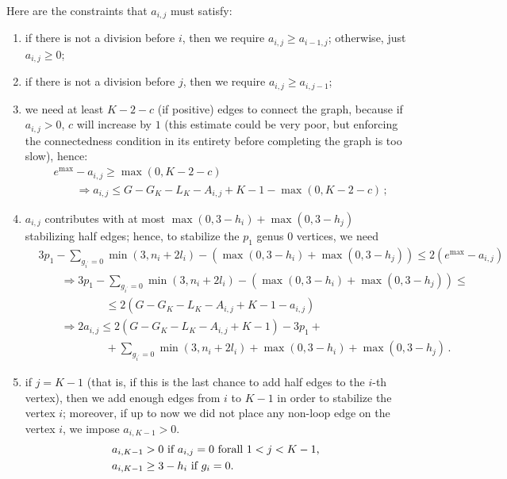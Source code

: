 \documentclass{amsart}
\theoremstyle{plain}
\theoremstyle{definition}
\DeclareMathOperator{\MAX}{max}
\begin{document}
Here are the constraints that $a_{i,j}$ must satisfy:
\begin{enumerate}
\item if there is not a division before $i$, then we require $a_{i,j} \geq
  a_{i-1,j}$; otherwise, just $a_{i,j} \geq 0$;
\item if there is not a division before $j$, then we require $a_{i,j}
  \geq a_{i,j-1}$;
\item we need at least $K-2-c$ (if positive) edges to connect the
  graph, because if $a_{i,j} > 0$, $c$ will increase by $1$ (this
  estimate could be very poor, but enforcing the connectedness
  condition in its entirety before completing the graph is too slow),
  hence:
  \begin{align*}
    &e^{\MAX} - a_{i,j} \geq \max(0, K-2-c)\\
    &\qquad\Rightarrow a_{i,j} \leq G - G_K - L_K - A_{i,j} +K - 1 - \max(0, K-2-c)\,\text{;}
  \end{align*}
\item $a_{i,j}$ contributes with at most $\max(0, 3-h_i) + \max(0,
  3-h_j)$ stabilizing half edges; hence, to stabilize the $p_1$ genus
  $0$ vertices, we need
  \begin{align*}
    &3p_1 - \sum_{g_{i^\prime} = 0} \min(3, n_i + 2l_i) - (\max(0, 3-h_i) + \max(0, 3-h_j)) \leq 2 (e^{\MAX} - a_{i,j})\\
    &\qquad\Rightarrow 3p_1 - \sum_{g_{i^\prime} = 0} \min(3, n_i + 2l_i) - (\max(0, 3-h_i) + \max(0, 3-h_j)) \leq \\
    &\qquad\qquad\qquad \leq 2 (G - G_K - L_K - A_{i,j} + K - 1 - a_{i,j})\\
    &\qquad\Rightarrow 2a_{i,j} \leq 2 (G - G_K - L_K - A_{i,j} + K - 1) - 3p_1 +\\
    &\qquad\qquad\qquad +\sum_{g_{i^\prime} = 0} \min(3, n_i + 2l_i) + \max(0, 3-h_i) + \max(0, 3-h_j)\,\text{.}
  \end{align*}
\item if $j = K-1$ (that is, if this is the last chance to add half
  edges to the $i$-th vertex), then we add enough edges from $i$ to
  $K-1$ in order to stabilize the vertex $i$; moreover, if up to now we did not
  place any non-loop edge on the vertex $i$, we impose $a_{i,K-1} > 0$.
  \begin{align*}
    &a_{i,K-1}>0 \text{ if $ a_{i,j} = 0$ forall $1<j<K-1$,}\\
    &a_{i,K-1}\geq 3-h_i\text{ if $g_i = 0$.}
  \end{align*}
\end{enumerate}
\end{document}
